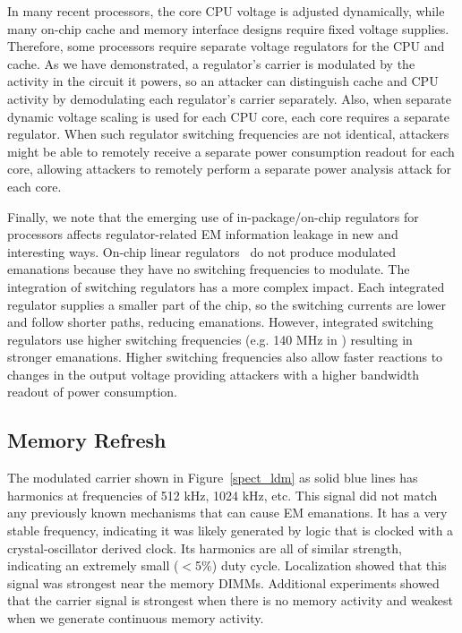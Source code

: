 In many recent processors, the core CPU voltage is adjusted dynamically, while many on-chip cache and memory interface designs require fixed voltage supplies. Therefore, some processors require separate voltage regulators for the CPU and cache. As we have demonstrated, a regulator's carrier is modulated by the activity in the circuit it powers, so an attacker can distinguish cache and CPU activity by demodulating each regulator's carrier separately. Also, when separate dynamic voltage scaling is used for each CPU core, each core requires a separate regulator. When such regulator switching frequencies are not identical, attackers might be able to remotely receive a separate power consumption readout for each core, allowing attackers to remotely perform a separate power analysis attack for each core.

Finally, we note that the emerging use of in-package/on-chip regulators for processors affects regulator-related EM information leakage in new and interesting ways. On-chip linear regulators~\cite{wang_2013} do not produce modulated emanations because they have no switching frequencies to modulate. The integration of switching regulators has a more complex impact. Each integrated regulator supplies a smaller part of the chip, so the switching currents are lower and follow shorter paths, reducing emanations. However, integrated switching regulators use higher switching frequencies (e.g. 140 MHz in \cite{burton_2014}) resulting in stronger emanations. Higher switching frequencies also allow faster reactions to changes in the output voltage providing attackers with a higher bandwidth readout of power consumption.

\subsection{Memory Refresh}

The modulated carrier shown in Figure~\ref{spect_ldm} as solid blue lines has harmonics at frequencies of 512 kHz, 1024 kHz, etc. This signal did not match any previously known mechanisms that can cause EM emanations. It has a very stable frequency, indicating it was likely generated by logic that is clocked with a crystal-oscillator derived clock. Its harmonics are all of similar strength, indicating an extremely small ($<$5\%) duty cycle. Localization showed that this signal was strongest near the memory DIMMs. Additional experiments showed that the carrier signal is strongest when there is no memory activity and weakest when we generate continuous memory activity. 


